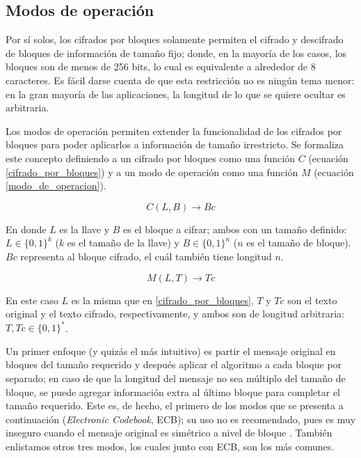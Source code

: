 %
%

\subsection{Modos de operación}

Por sí solos, los cifrados por bloques solamente permiten el cifrado y
descifrado de bloques de información de tamaño fijo; donde, en la mayoría de
los casos, los bloques son de menos de 256 bits\cite{modos_de_operacion}, lo
cual es equivalente a alrededor de 8 caracteres. Es fácil darse cuenta de que
esta restricción no es ningún tema menor: en la gran mayoría de las
aplicaciones, la longitud de lo que se quiere ocultar es arbitraria.

Los modos de operación permiten extender la funcionalidad de los cifrados por
bloques para poder aplicarlos a información de tamaño irrestricto. Se formaliza
este concepto definiendo a un cifrado por bloques como una función $ C $
(ecuación \ref{cifrado_por_bloques}) y a un modo de operación como una función
$ M $ (ecuación \ref{modo_de_operacion}).

\begin{equation}
  \label{cifrado_por_bloques}
  C(L, B) \rightarrow Bc
\end{equation}

En donde $ L $ es la llave y $ B $ es el bloque a cifrar; ambos con un tamaño
definido: $ L \in \{0, 1\}^k $ ($ k $ es el tamaño de la llave) y
$ B \in \{0, 1\}^n $ ($ n $ es el tamaño de bloque). $ Bc $ representa al
bloque cifrado, el cuál también tiene longitud $ n $.

\begin{equation}
  \label{modo_de_operacion}
  M(L, T) \rightarrow Tc
\end{equation}

En este caso $ L $ es la misma que en \ref{cifrado_por_bloques}, $ T $ y
$ Tc $ son el texto original y el texto cifrado, respectivamente, y ambos
son de longitud arbitraria: $ T, Tc \in \{0, 1\}^* $.

Un primer enfoque (y quizás el más intuitivo) es partir el mensaje original
en bloques del tamaño requerido y después aplicar el algoritmo a cada bloque
por separado; en caso de que la longitud del mensaje no sea múltiplo del
tamaño de bloque, se puede agregar información extra al último bloque para
completar el tamaño requerido. Este es, de hecho, el primero de los modos que
se presenta a continuación (\textit{Electronic Codebook}, ECB); su uso no es
recomendado, pues es muy inseguro cuando el mensaje original es simétrico a
nivel de bloque \cite{modos_de_operacion}. También enlistamos otros tres
modos, los cuales junto con ECB, son los más comunes.






